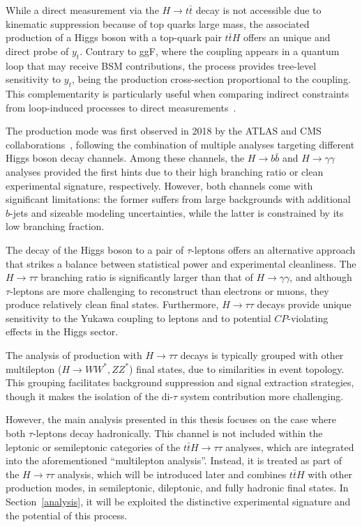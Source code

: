 While a direct measurement via the $H\to t\bar{t}$ decay is not accessible due to kinematic suppression because of top quarks large mass, the associated production of a Higgs boson with a top-quark pair $t\bar{t}H$ offers an unique and direct probe of $y_t$. Contrary to ggF, where the coupling appears in a quantum loop that may receive BSM contributions, the \ttH process provides tree-level sensitivity to $y_t$, being the production cross-section proportional to the coupling. This complementarity is particularly useful when comparing indirect constraints from loop-induced processes to direct measurements~\cite{Ng:1983jm,Kunszt:1984ri,Beenakker:2001rj}.

The \ttH production mode was first observed in 2018 by the ATLAS and CMS collaborations~\cite{ATLAS:2018mme,CMS:2018uxb}, following the combination of multiple analyses targeting different Higgs boson decay channels. Among these channels, the $H\to b \bar{b}$ and $H\to \gamma \gamma$ analyses provided the first hints due to their high branching ratio or clean experimental signature, respectively. However, both channels come with significant limitations: the former suffers from large backgrounds with additional $b$-jets and sizeable modeling uncertainties, while the latter is constrained by its low branching fraction.

The decay of the Higgs boson to a pair of $\tau$-leptons offers an alternative approach that strikes a balance between statistical power and experimental cleanliness. The $H\to\tau\tau$ branching ratio is significantly larger than that of $H\to \gamma \gamma$, and although $\tau$-leptons are more challenging to reconstruct than electrons or muons, they produce relatively clean final states. Furthermore, $H\to\tau\tau$ decays provide unique sensitivity to the Yukawa coupling to leptons and to potential $CP$-violating effects in the Higgs sector.

The analysis of \ttH production with $H\to\tau\tau$ decays is typically grouped with other multilepton ($H\to WW^*, ZZ^*$) final states, due to similarities in event topology. This grouping facilitates background suppression and signal extraction strategies, though it makes the isolation of the di-$\tau$ system contribution more challenging. 

However, the main analysis presented in this thesis focuses on the case where both $\tau$-leptons decay hadronically. This channel is not included within the leptonic or semileptonic categories of the $t\bar{t}H \to \tau\tau$ analyses, which are integrated into the aforementioned ``multilepton analysis''. Instead, it is treated as part of the $H\to\tau\tau$ analysis, which will be introduced later and combines $t\bar{t}H$ with other production modes, in semileptonic, dileptonic, and fully hadronic final states. In Section~\ref{analysis}, it will be exploited the distinctive experimental signature and the potential of this process.



